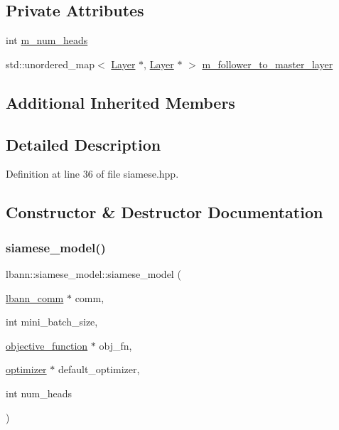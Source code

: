\subsection*{Private Attributes}
\begin{DoxyCompactItemize}
\item 
int \hyperlink{classlbann_1_1siamese__model_ad0d7ba3cf40120b4f8e32675c5e9b3db}{m\+\_\+num\+\_\+heads}
\item 
std\+::unordered\+\_\+map$<$ \hyperlink{classlbann_1_1Layer}{Layer} $\ast$, \hyperlink{classlbann_1_1Layer}{Layer} $\ast$ $>$ \hyperlink{classlbann_1_1siamese__model_aae7af40b4a2db59082cd4c9149a1affd}{m\+\_\+follower\+\_\+to\+\_\+master\+\_\+layer}
\end{DoxyCompactItemize}
\subsection*{Additional Inherited Members}


\subsection{Detailed Description}


Definition at line 36 of file siamese.\+hpp.



\subsection{Constructor \& Destructor Documentation}
\mbox{\label{classlbann_1_1siamese__model_af8ca6d6da679f39489f0c50b62ad0069}} 
\subsubsection{\texorpdfstring{siamese\+\_\+model()}{siamese\_model()}\hspace{0.1cm}{\footnotesize\ttfamily [1/2]}}
{\footnotesize\ttfamily lbann\+::siamese\+\_\+model\+::siamese\+\_\+model (\begin{DoxyParamCaption}\item[{\hyperlink{classlbann_1_1lbann__comm}{lbann\+\_\+comm} $\ast$}]{comm,  }\item[{int}]{mini\+\_\+batch\+\_\+size,  }\item[{\hyperlink{classlbann_1_1objective__function}{objective\+\_\+function} $\ast$}]{obj\+\_\+fn,  }\item[{\hyperlink{classlbann_1_1optimizer}{optimizer} $\ast$}]{default\+\_\+optimizer,  }\item[{int}]{num\+\_\+heads }\end{DoxyParamCaption})}



